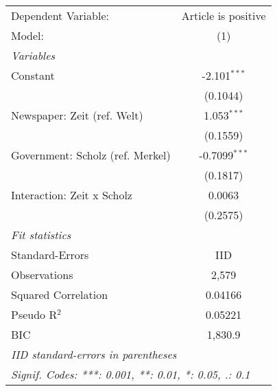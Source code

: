 
\begingroup
\centering
\begin{tabular}{lc}
   \tabularnewline \midrule \midrule
   Dependent Variable:              & Article is positive\\  
   Model:                           & (1)\\  
   \midrule
   \emph{Variables}\\
   Constant                         & -2.101$^{***}$\\   
                                    & (0.1044)\\   
   Newspaper: Zeit (ref. Welt)      & 1.053$^{***}$\\   
                                    & (0.1559)\\   
   Government: Scholz (ref. Merkel) & -0.7099$^{***}$\\   
                                    & (0.1817)\\   
   Interaction: Zeit x Scholz       & 0.0063\\   
                                    & (0.2575)\\   
   \midrule
   \emph{Fit statistics}\\
   Standard-Errors                  & IID \\   
   Observations                     & 2,579\\  
   Squared Correlation              & 0.04166\\  
   Pseudo R$^2$                     & 0.05221\\  
   BIC                              & 1,830.9\\  
   \midrule \midrule
   \multicolumn{2}{l}{\emph{IID standard-errors in parentheses}}\\
   \multicolumn{2}{l}{\emph{Signif. Codes: ***: 0.001, **: 0.01, *: 0.05, .: 0.1}}\\
\end{tabular}
\par\endgroup


